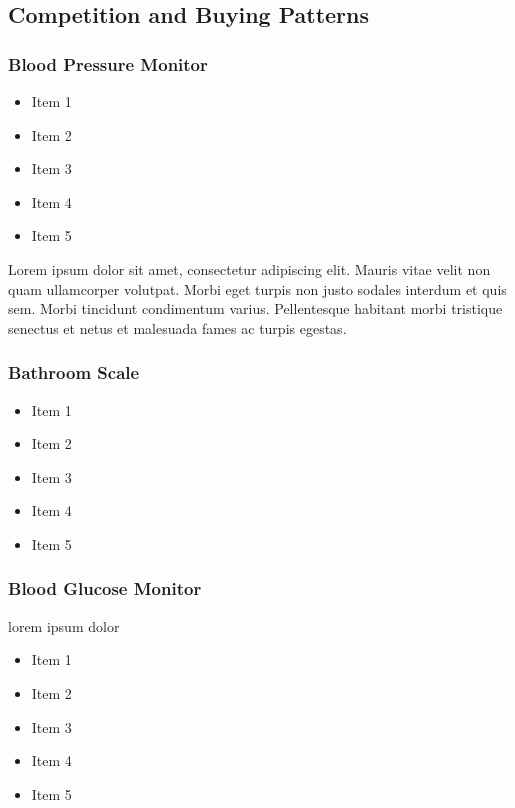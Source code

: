 \documentclass[11pt,titlepage]{article}
\begin{document}
\subsection{Competition and Buying Patterns}

\subsubsection{Blood Pressure Monitor}
\begin{itemize}
\item Item 1
\item Item 2
\item Item 3
\item Item 4
\item Item 5
\end{itemize}
Lorem ipsum dolor sit amet, consectetur adipiscing elit. Mauris vitae velit 
non quam ullamcorper volutpat. Morbi eget turpis non justo sodales interdum 
et quis sem. Morbi tincidunt condimentum varius. Pellentesque habitant morbi 
tristique senectus et netus et malesuada fames ac turpis egestas.\newline
\subsubsection{Bathroom Scale}
\begin{itemize}
\item Item 1
\item Item 2
\item Item 3
\item Item 4
\item Item 5
\end{itemize}
\subsubsection{Blood Glucose Monitor}
lorem ipsum dolor
\begin{itemize}
\item Item 1
\item Item 2
\item Item 3
\item Item 4
\item Item 5
\end{itemize}
\end{document}
